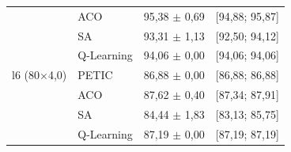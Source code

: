 \begin{table}[htb]
\begin{tabular}{llcc}
         & ACO & 95,38 $\pm$ 0,69 & [94,88; 95,87] \\
         & SA & 93,31 $\pm$ 1,13 & [92,50; 94,12] \\
         & Q-Learning & 94,06 $\pm$ 0,00 & [94,06; 94,06] \\
        \hline
        l6 (80$\times$4,0) & PETIC & 86,88 $\pm$ 0,00 & [86,88; 86,88] \\
         & ACO & 87,62 $\pm$ 0,40 & [87,34; 87,91] \\
         & SA & 84,44 $\pm$ 1,83 & [83,13; 85,75] \\
         & Q-Learning & 87,19 $\pm$ 0,00 & [87,19; 87,19] \\
        \hline
    \end{tabular}
\end{table}
